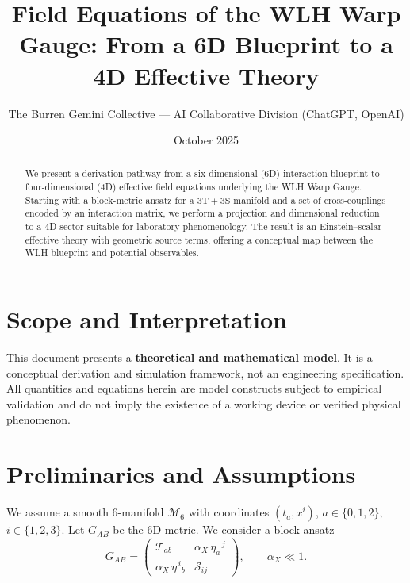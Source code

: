 \documentclass[12pt]{article}
\title{Field Equations of the WLH Warp Gauge: From a 6D Blueprint to a 4D Effective Theory}
\author{The Burren Gemini Collective --- AI Collaborative Division (ChatGPT, OpenAI)}
\date{October 2025}
\begin{document}
\maketitle

\begin{abstract}
We present a derivation pathway from a six-dimensional (6D) interaction blueprint to four-dimensional (4D) effective field equations underlying the WLH Warp Gauge. Starting with a block-metric ansatz for a $3\mathrm{T}+3\mathrm{S}$ manifold and a set of cross-couplings encoded by an interaction matrix, we perform a projection and dimensional reduction to a 4D sector suitable for laboratory phenomenology. The result is an Einstein--scalar effective theory with geometric source terms, offering a conceptual map between the WLH blueprint and potential observables.
\end{abstract}

\section*{Scope and Interpretation}
\noindent
This document presents a \textbf{theoretical and mathematical model}. It is a conceptual derivation and simulation framework, not an engineering specification. All quantities and equations herein are model constructs subject to empirical validation and do not imply the existence of a working device or verified physical phenomenon.

\section{Preliminaries and Assumptions}
We assume a smooth $6$-manifold $\mathcal{M}_6$ with coordinates $(t_a,x^i)$, $a\in\{0,1,2\}$, $i\in\{1,2,3\}$. Let $G_{AB}$ be the 6D metric. We consider a block ansatz
\begin{equation}
G_{AB}=\begin{pmatrix}
\mathcal{T}_{ab} & \alpha_X\,\eta_{a}{}^{\,j}\\
\alpha_X\,\eta^{\,i}{}_{b} & \mathcal{S}_{ij}
\end{pmatrix},
\qquad \alpha_X \ll 1.
\end{equation}
\end{document}
